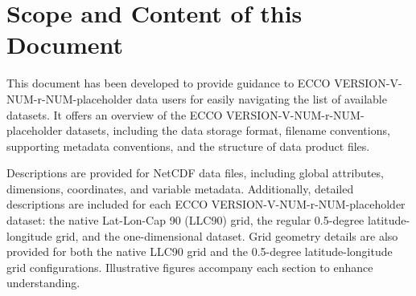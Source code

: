 \pagebreak
\section{Scope and Content of this Document}

\par This document has been developed to provide guidance to ECCO VERSION-V-NUM-r-NUM-placeholder data users for easily navigating the list of available datasets. It offers an overview of the ECCO VERSION-V-NUM-r-NUM-placeholder datasets, including the data storage format, filename conventions, supporting metadata conventions, and the structure of data product files.

\par Descriptions are provided for NetCDF data files, including global attributes, dimensions, coordinates, and variable metadata. Additionally, detailed descriptions are included for each ECCO VERSION-V-NUM-r-NUM-placeholder dataset: the native Lat-Lon-Cap 90 (LLC90) grid, the regular 0.5-degree latitude-longitude grid, and the one-dimensional dataset. Grid geometry details are also provided for both the native LLC90 grid and the 0.5-degree latitude-longitude grid configurations. Illustrative figures accompany each section to enhance understanding.
